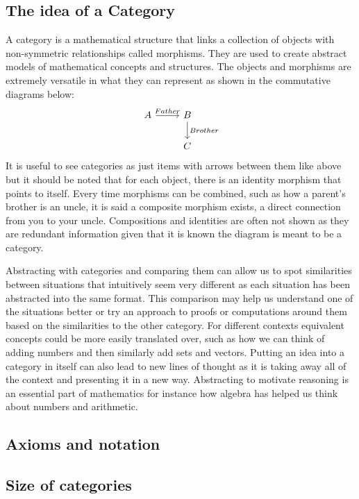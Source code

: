 \documentclass{article}
\begin{document}
\subsection{The idea of a Category}
A category is a mathematical structure that links a collection of objects with non-symmetric relationships called morphisms.
They are used to create abstract models of mathematical concepts and structures.
The objects and morphisms are extremely versatile in what they can represent as shown in the commutative diagrams below:
\begin{equation}
    \begin{tikzcd} 
        A \ar[r,"Father"]
            & B \ar[d,"Brother"] \\
            & C
    \end{tikzcd}
\end{equation}
It is useful to see categories as just items with arrows between them like
above but it should be noted that for each object, there is an identity
morphism that points to itself.  Every time morphisms can be combined, such
as how a parent's brother is an uncle, it is said a composite morphism
exists, a direct connection from you to your uncle.  Compositions and
identities are often not shown as they are redundant information given that
it is known the diagram is meant to be a category.

Abstracting with categories and comparing them can allow us to spot
similarities between situations that intuitively seem very different as
each situation has been abstracted into the same format.  This comparison
may help us understand one of the situations better or try an approach to
proofs or computations around them based on the similarities to the other
category.  For different contexts equivalent concepts could be more easily
translated over, such as how we can think of adding numbers and then
similarly add sets and vectors.  Putting an idea into a category in itself
can also lead to new lines of thought as it is taking away all of the
context and presenting it in a new way.  Abstracting to motivate reasoning
is an essential part of mathematics for instance how algebra has helped us
think about numbers and arithmetic.
\subsection{Axioms and notation}
\subsection{Size of categories}
\end{document}
